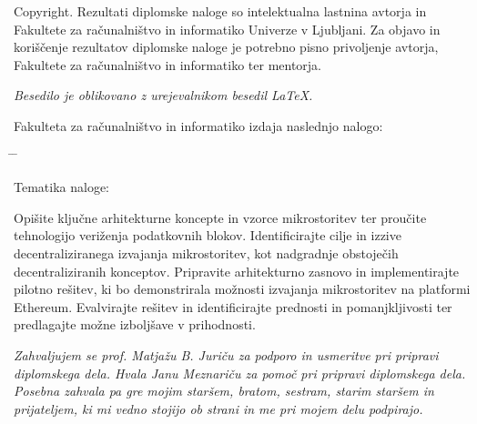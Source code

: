 \documentclass[a4paper, 12pt]{book}
\newcommand{\clearemptydoublepage}{\newpage{\pagestyle{empty}\cleardoublepage}}
\begin{document}
\noindent
{\sc Copyright}. 
Rezultati diplomske naloge so intelektualna lastnina avtorja in Fakultete za računalništvo in informatiko Univerze v Ljubljani.
Za objavo in koriščenje rezultatov diplomske naloge je potrebno pisno privoljenje avtorja, Fakultete za računalništvo in informatiko ter mentorja.

\begin{center}
\mbox{}\vfill
\emph{Besedilo je oblikovano z urejevalnikom besedil \LaTeX.}
\end{center}
\clearemptydoublepage

\thispagestyle{empty}
\vspace*{4cm}

\noindent
Fakulteta za računalništvo in informatiko izdaja naslednjo nalogo:
\medskip
\begin{tabbing}
\hspace{32mm}\= \hspace{6cm} \= \kill




Tematika naloge:
\end{tabbing}
Opišite ključne arhitekturne koncepte in vzorce mikrostoritev ter proučite tehnologijo veriženja podatkovnih blokov. Identificirajte cilje in izzive decentraliziranega izvajanja mikrostoritev, kot nadgradnje obstoječih decentraliziranih konceptov. Pripravite arhitekturno zasnovo in implementirajte pilotno rešitev, ki bo demonstrirala možnosti izvajanja mikrostoritev na platformi Ethereum. Evalvirajte rešitev in identificirajte prednosti in pomanjkljivosti ter predlagajte možne izboljšave v prihodnosti. 
\vspace{15mm}



\vspace{2cm}

\clearemptydoublepage

\thispagestyle{empty}\mbox{}\vfill\null\it%
\noindent
Zahvaljujem se prof. Matjažu B. Juriču za podporo in usmeritve pri pripravi diplomskega dela. Hvala Janu Meznariču za pomoč pri pripravi diplomskega dela. Posebna zahvala pa gre mojim staršem, bratom, sestram, starim staršem in prijateljem, ki mi vedno stojijo ob strani in me pri mojem delu podpirajo.
\rm\normalfont

\clearemptydoublepage

\end{document}
